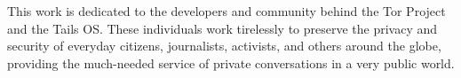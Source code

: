 

\begin{dedication}

This work is dedicated to the developers and community behind the Tor Project and the Tails OS. These individuals work tirelessly to preserve the privacy and security of everyday citizens, journalists, activists, and others around the globe, providing the much-needed service of private conversations in a very public world.

\end{dedication}
